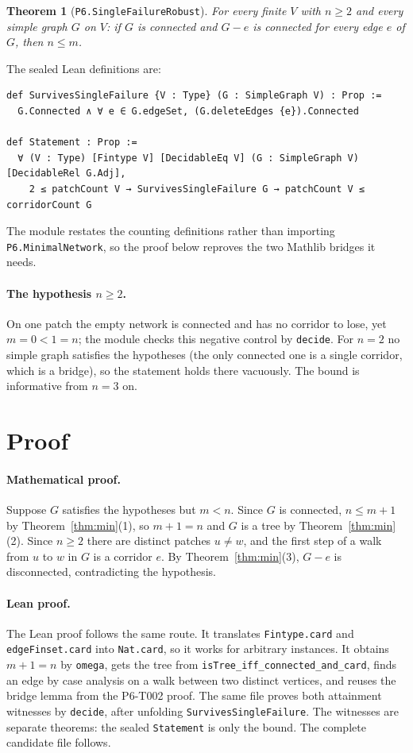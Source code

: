 \documentclass[11pt]{article}
\newtheorem{theorem}{Theorem}
\begin{document}
\begin{theorem}[\texttt{P6.SingleFailureRobust}]\label{thm:robust}
For every finite $V$ with $n\ge 2$ and every simple graph $G$ on $V$: if $G$ is connected and $G-e$ is
connected for every edge $e$ of $G$, then $n\le m$.
\end{theorem}

The sealed Lean definitions are:
\begin{lstlisting}
def SurvivesSingleFailure {V : Type} (G : SimpleGraph V) : Prop :=
  G.Connected ∧ ∀ e ∈ G.edgeSet, (G.deleteEdges {e}).Connected

def Statement : Prop :=
  ∀ (V : Type) [Fintype V] [DecidableEq V] (G : SimpleGraph V) [DecidableRel G.Adj],
    2 ≤ patchCount V → SurvivesSingleFailure G → patchCount V ≤ corridorCount G
\end{lstlisting}
The module restates the counting definitions rather than importing \texttt{P6.MinimalNetwork}, so the
proof below reproves the two Mathlib bridges it needs.

\paragraph{The hypothesis $n\ge 2$.} On one patch the empty network is connected and has no corridor to
lose, yet $m=0<1=n$; the module checks this negative control by \texttt{decide}. For $n=2$ no simple graph
satisfies the hypotheses (the only connected one is a single corridor, which is a bridge), so the
statement holds there vacuously. The bound is informative from $n=3$ on.

\section{Proof}
\paragraph{Mathematical proof.} Suppose $G$ satisfies the hypotheses but $m<n$. Since $G$ is connected,
$n\le m+1$ by Theorem~\ref{thm:min}(1), so $m+1=n$ and $G$ is a tree by Theorem~\ref{thm:min}(2). Since
$n\ge 2$ there are distinct patches $u\neq w$, and the first step of a walk from $u$ to $w$ in $G$ is a
corridor $e$. By Theorem~\ref{thm:min}(3), $G-e$ is disconnected, contradicting the hypothesis.

\paragraph{Lean proof.} The Lean proof follows the same route. It translates \texttt{Fintype.card} and
\texttt{edgeFinset.card} into \texttt{Nat.card}, so it works for arbitrary instances. It obtains $m+1=n$ by
\texttt{omega}, gets the tree from \texttt{isTree\_iff\_connected\_and\_card}, finds an edge by case analysis
on a walk between two distinct vertices, and reuses the bridge lemma from the P6-T002 proof. The same file
proves both attainment witnesses by \texttt{decide}, after unfolding \texttt{SurvivesSingleFailure}. The
witnesses are separate theorems: the sealed \texttt{Statement} is only the bound. The complete candidate
file follows.
\end{document}

